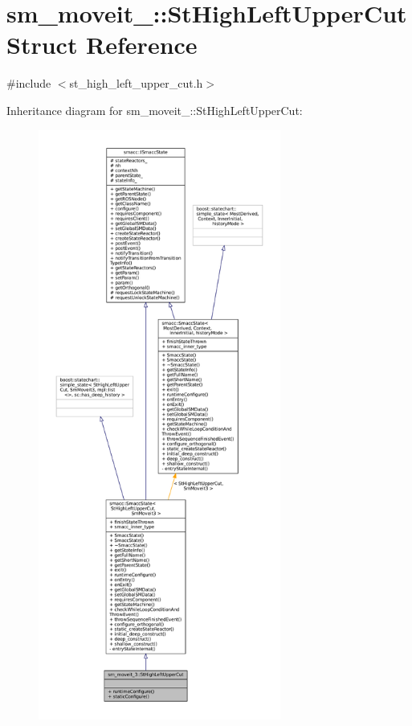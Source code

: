 \hypertarget{structsm__moveit__3_1_1StHighLeftUpperCut}{}\section{sm\+\_\+moveit\+\_\+:\+:St\+High\+Left\+Upper\+Cut Struct Reference}
\label{structsm__moveit__3_1_1StHighLeftUpperCut}


{\ttfamily \#include $<$st\+\_\+high\+\_\+left\+\_\+upper\+\_\+cut.\+h$>$}



Inheritance diagram for sm\+\_\+moveit\+\_\+:\+:St\+High\+Left\+Upper\+Cut\+:
\nopagebreak
\begin{figure}[H]
\begin{center}
\leavevmode
\includegraphics[height=550pt]{structsm__moveit__3_1_1StHighLeftUpperCut__inherit__graph}
\end{center}
\end{figure}



